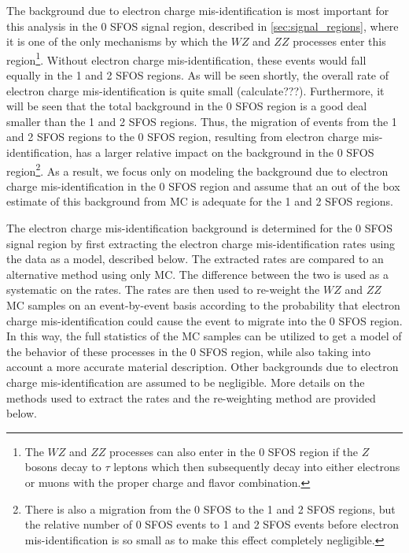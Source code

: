 The background due to electron charge mis-identification is most important 
for this analysis
in the 0 SFOS signal region, described in \sec\ref{sec:signal_regions},
where it is one of the only mechanisms by which the $WZ$ and $ZZ$ 
processes enter this region\footnote{The $WZ$ and $ZZ$ processes
can also enter in the 0 SFOS region if the $Z$ bosons
decay to $\tau$ leptons which then subsequently decay into 
either electrons or muons with the proper charge and flavor combination.}.
Without electron charge mis-identification, these events would fall
equally in the 1 and 2 SFOS regions.
As will be seen shortly, the overall rate of electron charge mis-identification
is quite small (calculate???). 
Furthermore, it will be seen that the total background in the 0 SFOS region is 
a good deal smaller than the 1 and 2 SFOS regions. Thus, the
migration of events from the 1 and 2 SFOS regions to the 0 SFOS 
region, resulting from electron charge mis-identification, has
a larger relative impact on the background in the 0 SFOS 
region\footnote{There is also a migration from the 0 SFOS to the 1 and 2 SFOS 
regions, but the relative number of 0 SFOS events to 1 and 2 SFOS
events before electron mis-identification is so small as to make this
effect completely negligible.}.
As a result, we focus only on modeling the background due to electron
charge mis-identification in the 0 SFOS region and assume that an 
out of the box estimate of this background from MC is adequate for the 
1 and 2 SFOS regions.


The electron charge mis-identification background is determined
for the 0 SFOS signal region by first extracting the electron charge
mis-identification rates using the data as a model,
described below. The extracted
rates are compared to an alternative method using only MC. 
The difference between the two is used as a systematic on the
rates. The rates are then used to re-weight the $WZ$ and $ZZ$ MC samples
on an event-by-event basis 
according to the probability that electron charge mis-identification
could cause the event to migrate into the 0 SFOS region. In this way, 
the full statistics of the MC samples can be utilized to get a model of
the behavior of these processes in the 0 SFOS region, while also taking 
into account a more accurate material description. Other backgrounds
due to electron charge mis-identification are assumed to be negligible.
More details on the methods used to extract the rates and the re-weighting
method are provided below.





